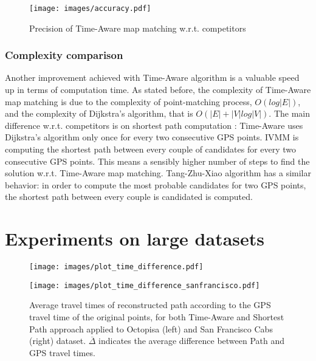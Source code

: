 \documentclass[5p]{elsarticle}
\begin{document}
\begin{figure}[h!]

\centering
\hspace{-2cm}\texttt{[image: images/accuracy.pdf]}
\caption{Precision of Time-Aware map matching w.r.t. competitors}
\label{precision}
\end{figure}



\subsubsection{Complexity comparison} 
Another improvement achieved with Time-Aware algorithm is a valuable speed up in terms of computation time. 
As stated before, the complexity of Time-Aware map matching is due to the complexity of point-matching process, $O(log |E|)$, 
and the complexity of Dijkstra's algorithm, that is $O(|E| + |V| log |V|)$.
The main difference w.r.t. competitors is on shortest path computation : Time-Aware uses Dijkstra's algorithm only once for 
every two consecutive GPS points. 
IVMM is computing the shortest path between every couple of candidates for every two consecutive GPS points. 
This means a sensibly higher number of steps to find the solution
w.r.t. 
Time-Aware map matching. Tang-Zhu-Xiao algorithm has a similar behavior: 
in order to compute the most probable candidates for two GPS points, the shortest path between every couple
is candidated is computed.  

\section{Experiments on large datasets} \label{large-dataset}
\begin{figure*}[htbp]
\centering
\begin{minipage}[b]{0.45\linewidth}
\centering
\texttt{[image: images/plot\_time\_difference.pdf]}


\end{minipage}
\quad
\begin{minipage}[b]{0.45\linewidth}
  
\centering
\texttt{[image: images/plot\_time\_difference\_sanfrancisco.pdf]}

\end{minipage}
\caption{Average travel times of reconstructed path according to the GPS travel time of the original points, for both Time-Aware and Shortest Path approach applied to Octopisa (left)  and San Francisco Cabs (right) dataset. $\overline{\Delta}$ indicates the average difference between Path and
GPS travel times.}\label{time_difference_Compare}
\end{figure*}
\end{document}
